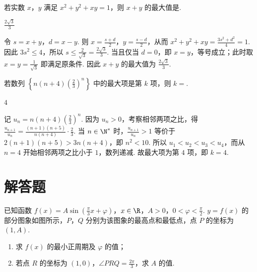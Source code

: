 \begin{problem}
若实数 \(x\)，\(y\) 满足 \(x^{2} + y^{2} + xy = 1\)，则 \(x + y\) 的最大值是\fillinblank{}.
\end{problem}

\begin{answer}
\(\frac{2\sqrt{3}}{3}\)
\end{answer}

\begin{solution}
令 \(s=x+y\)，\(d=x-y\). 则 \(x=\frac{s+d}{2}\)，\(y=\frac{s-d}{2}\)，从而 \(x^2+y^2+xy=\frac{3s^2+d^2}{4}=1\). 因此 \(3s^2\leqslant4\)，所以 \(s\leqslant\frac2{\sqrt3}=\frac{2\sqrt3}{3}\). 当且仅当 \(d=0\)，即 \(x=y\)，等号成立；此时取 \(x=y=\frac1{\sqrt3}\) 即满足原条件. 因此 \(x+y\) 的最大值为 \(\frac{2\sqrt3}{3}\).
\end{solution}

\begin{problem}
若数列 \(\left\{n(n + 4)\left(\frac{2}{3}\right)^n\right\}\) 中的最大项是第 \(k\) 项，则 \(k = \)\fillinblank{}.
\end{problem}

\begin{answer}
\(4\)
\end{answer}

\begin{solution}
记 \(u_n=n(n+4)\left(\frac23\right)^n\). 因为 \(u_n>0\)，考察相邻两项之比，得 \(\frac{u_{n+1}}{u_n}=\frac{(n+1)(n+5)}{n(n+4)}\cdot\frac23\). 当 \(n\in\N^*\) 时，\(\frac{u_{n+1}}{u_n}>1\) 等价于 \(2(n+1)(n+5)>3n(n+4)\)，即 \(n^2<10\). 所以 \(u_1<u_2<u_3<u_4\)，而从 \(n=4\) 开始相邻两项之比小于 \(1\)，数列递减. 故最大项为第 \(4\) 项，即 \(k=4\).
\end{solution}

\section{解答题}

\begin{problem}
已知函数 \( f(x) = A \sin \left( \frac{\pi}{3} x + \varphi \right) \)，\( x \in \R \)，\(A > 0\)，\(0 < \varphi < \frac{\pi}{2}\). \( y = f(x) \) 的部分图象如图所示，\(P\)，\(Q\) 分别为该图象的最高点和最低点，点 \(P\) 的坐标为 \((1,A)\).

\begin{enumerate}
\item 求 \( f(x) \) 的最小正周期及 \( \varphi \) 的值；
\item 若点 \(R\) 的坐标为 \((1,0)\)，\(\angle PRQ = \frac{2\pi}{3}\)，求 \(A\) 的值.
\end{enumerate}

\end{problem}

